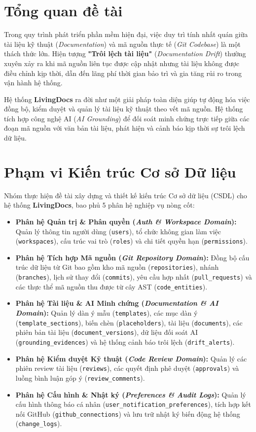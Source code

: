 \section*{Tổng quan đề tài}
Trong quy trình phát triển phần mềm hiện đại, việc duy trì tính nhất quán giữa tài liệu kỹ thuật (\textit{Documentation}) và mã nguồn thực tế (\textit{Git Codebase}) là một thách thức lớn. Hiện tượng \textbf{"Trôi lệch tài liệu"} (\textit{Documentation Drift}) thường xuyên xảy ra khi mã nguồn liên tục được cập nhật nhưng tài liệu không được điều chỉnh kịp thời, dẫn đến lãng phí thời gian bảo trì và gia tăng rủi ro trong vận hành hệ thống.

Hệ thống \textbf{LivingDocs} ra đời như một giải pháp toàn diện giúp tự động hóa việc đồng bộ, kiểm duyệt và quản lý tài liệu kỹ thuật theo vết mã nguồn. Hệ thống tích hợp công nghệ AI (\textit{AI Grounding}) để đối soát minh chứng trực tiếp giữa các đoạn mã nguồn với văn bản tài liệu, phát hiện và cảnh báo kịp thời sự trôi lệch dữ liệu.

\section*{Phạm vi Kiến trúc Cơ sở Dữ liệu}
Nhóm thực hiện đề tài xây dựng và thiết kế kiến trúc Cơ sở dữ liệu (CSDL) cho hệ thống \textbf{LivingDocs}, bao phủ 5 phân hệ nghiệp vụ nòng cốt:

\begin{itemize}
    \item \textbf{Phân hệ Quản trị \& Phân quyền (\textit{Auth \& Workspace Domain}):} Quản lý thông tin người dùng (\texttt{users}), tổ chức không gian làm việc (\texttt{workspaces}), cấu trúc vai trò (\texttt{roles}) và chi tiết quyền hạn (\texttt{permissions}).
    \item \textbf{Phân hệ Tích hợp Mã nguồn (\textit{Git Repository Domain}):} Đồng bộ cấu trúc dữ liệu từ Git bao gồm kho mã nguồn (\texttt{repositories}), nhánh (\texttt{branches}), lịch sử thay đổi (\texttt{commits}), yêu cầu hợp nhất (\texttt{pull\_requests}) và các thực thể mã nguồn thu được từ cây AST (\texttt{code\_entities}).
    \item \textbf{Phân hệ Tài liệu \& AI Minh chứng (\textit{Documentation \& AI Domain}):} Quản lý dàn ý mẫu (\texttt{templates}), các mục dàn ý (\texttt{template\_sections}), biến chèn (\texttt{placeholders}), tài liệu (\texttt{documents}), các phiên bản tài liệu (\texttt{document\_versions}), dữ liệu đối soát AI (\texttt{grounding\_evidences}) và hệ thống cảnh báo trôi lệch (\texttt{drift\_alerts}).
    \item \textbf{Phân hệ Kiểm duyệt Kỹ thuật (\textit{Code Review Domain}):} Quản lý các phiên review tài liệu (\texttt{reviews}), các quyết định phê duyệt (\texttt{approvals}) và luồng bình luận góp ý (\texttt{review\_comments}).
    \item \textbf{Phân hệ Cấu hình \& Nhật ký (\textit{Preferences \& Audit Logs}):} Quản lý cấu hình thông báo cá nhân (\texttt{user\_notification\_preferences}), tích hợp kết nối GitHub (\texttt{github\_connections}) và lưu trữ nhật ký biến động hệ thống (\texttt{change\_logs}).
\end{itemize}

